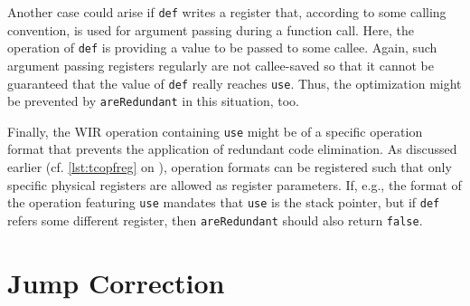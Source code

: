 Another case could arise if \texttt{def} writes a register that, according to some calling convention, is used for argument passing during a function call.
Here, the operation of \texttt{def} is providing a value to be passed to some callee.
Again, such argument passing registers regularly are not callee-saved so that it cannot be guaranteed that the value of \texttt{def} really reaches \texttt{use}.
Thus, the optimization might be prevented by \texttt{areRedundant} in this situation, too.

Finally, the \gls{WIR} operation containing \texttt{use} might be of a specific operation format that prevents the application of redundant code elimination.
As discussed earlier (cf. \cref{lst:tcopfreg} on ), operation formats can be registered such that only specific physical registers are allowed as register parameters.
If, e.g., the format of the operation featuring \texttt{use} mandates that \texttt{use} is the stack pointer, but if \texttt{def} refers some different register, then \texttt{areRedundant} should also return \texttt{false}.


\section{Jump Correction}
\label{sec:optjumpsretarget}

